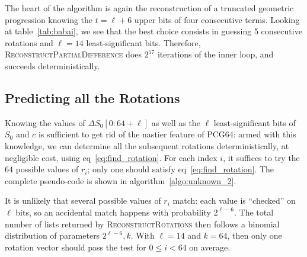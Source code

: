 \documentclass[journal=tosc,final]{iacrtrans}
\begin{document}
The heart of the algorithm is again the reconstruction of a truncated geometric
progression knowing the \(t=\ell+6\) upper bits of four consecutive terms. Looking at table~\ref{tab:babai}, we see that the best choice
consists in guessing 5 consecutive rotations and $\ell=14$ least-significant
bits. Therefore, \textsc{ReconstructPartialDifference} does $2^{57}$ iterations
of the inner loop, and succeeds deterministically.

\subsection{Predicting all the Rotations}

Knowing the values of $\Delta S_0[0:64+\ell]$ as well as the $\ell$
least-significant bits of $S_0$ and $c$ is sufficient to get rid of the nastier
feature of \textsf{PCG64}: armed with this knowledge, we can determine all the
subsequent rotations deterministically, at negligible cost, using
eq~\eqref{eq:find_rotation}. For each index $i$, it suffices to try the $64$
possible values of $r_i$; only one should satisfy
eq~\eqref{eq:find_rotation}. The complete pseudo-code is shown in
algorithm~\ref{algo:unknown_2}.

It is unlikely that several possible values of $r_i$ match: each value is
``checked'' on $\ell$ bits, so an accidental match happens with probability
$2^{\ell-6}$. The total number of lists returned by
\textsc{ReconstructRotations} then follows a binomial distribution of parameters
$2^{\ell-6}, k$. With $\ell=14$ and $k=64$, then only one rotation vector should
pass the test for $0 \leq i < 64$ on average.
\end{document}
